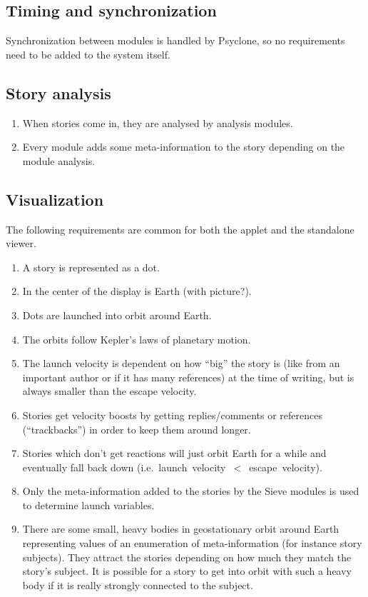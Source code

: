 \subsection{Timing and synchronization}

Synchronization between modules is handled by Psyclone, so no requirements need
to be added to the system itself.

\subsection{Story analysis}

\begin{enumerate}
  \item When stories come in, they are analysed by analysis modules.
  \item Every module adds some meta-information to the story depending on the
        module analysis.
\end{enumerate}

\subsection{Visualization}

The following requirements are common for both the applet and the standalone
viewer.

\begin{enumerate}
  \item A story is represented as a dot.
  \item In the center of the display is Earth (with picture?).
  \item Dots are launched into orbit around Earth.
  \item The orbits follow Kepler's laws of planetary motion.
  \item The launch velocity is dependent on how ``big'' the story is (like from
        an important author or if it has many references) at the time of
        writing, but is always smaller than the escape velocity.
  \item Stories get velocity boosts by getting replies/comments or
        references (``trackbacks'') in order to keep them around longer.
  \item Stories which don't get reactions will just orbit Earth for a while and
        eventually fall back down \mbox{(i.e. launch velocity $<$ escape
        velocity)}.
  \item Only the meta-information added to the stories by the Sieve modules is
        used to determine launch variables.
  \item There are some small, heavy bodies in geostationary orbit around Earth
        representing values of an enumeration of meta-information (for instance
        story subjects). They attract the stories depending on how much they
        match the story's subject. It is possible for a story to get into orbit
        with such a heavy body if it is really strongly connected to the
        subject.
\end{enumerate}

